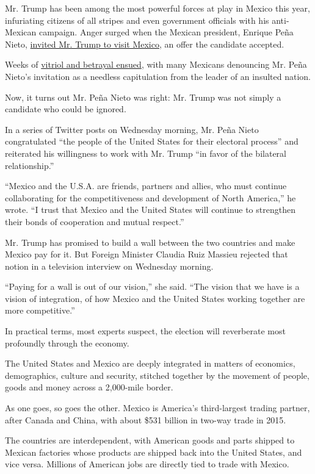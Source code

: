 Mr. Trump has been among the most powerful forces at play in Mexico this
year, infuriating citizens of all stripes and even government officials
with his anti-Mexican campaign. Anger surged when the Mexican president,
Enrique Peña Nieto,
\href{http://www.nytimes.com/2016/09/01/world/americas/trump-mexico-pena-nieto-reaction.html}{invited
Mr. Trump to visit Mexico}, an offer the candidate accepted.

Weeks of
\href{http://www.nytimes.com/2016/09/08/world/americas/mexico-finance-minister-luis-videgaray-resigns.html}{vitriol
and betrayal ensued}, with many Mexicans denouncing Mr. Peña Nieto's
invitation as a needless capitulation from the leader of an insulted
nation.

Now, it turns out Mr. Peña Nieto was right: Mr. Trump was not simply a
candidate who could be ignored.

In a series of Twitter posts on Wednesday morning, Mr. Peña Nieto
congratulated ``the people of the United States for their electoral
process'' and reiterated his willingness to work with Mr. Trump ``in
favor of the bilateral relationship.''

``Mexico and the U.S.A. are friends, partners and allies, who must
continue collaborating for the competitiveness and development of North
America,'' he wrote. ``I trust that Mexico and the United States will
continue to strengthen their bonds of cooperation and mutual respect.''

Mr. Trump has promised to build a wall between the two countries and
make Mexico pay for it. But Foreign Minister Claudia Ruiz Massieu
rejected that notion in a television interview on Wednesday morning.

``Paying for a wall is out of our vision,'' she said. ``The vision that
we have is a vision of integration, of how Mexico and the United States
working together are more competitive.''

In practical terms, most experts suspect, the election will reverberate
most profoundly through the economy.

The United States and Mexico are deeply integrated in matters of
economics, demographics, culture and security, stitched together by the
movement of people, goods and money across a 2,000-mile border.

As one goes, so goes the other. Mexico is America's third-largest
trading partner, after Canada and China, with about \$531 billion in
two-way trade in 2015.

The countries are interdependent, with American goods and parts shipped
to Mexican factories whose products are shipped back into the United
States, and vice versa. Millions of American jobs are directly tied to
trade with Mexico.

